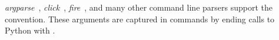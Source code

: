 \emph{argparse}~\cite{argparse}, \emph{click}~\cite{click}, \emph{fire}~\cite{python_fire}, and many other command line parsers support the  convention. These arguments are captured in commands by ending calls to Python with .
